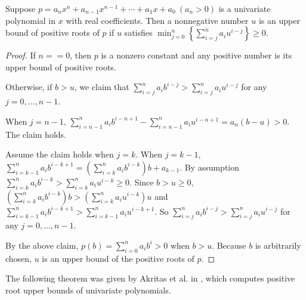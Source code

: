 \begin{theorem} \label{thm:log}
  Suppose   $p=a_nx^n+a_{n-1}x^{n-1}+\cdots+a_1x+a_0\ (a_n>0)$  is a univariate polynomial in $x$ with real coefficients.  Then  a nonnegative number $u$ is an upper bound of positive roots of $p$ if $u$   satisfies $\min_{j=0}^{n}\left\{  \sum_{i=j}^n a_i u^{i-j}\right\}\ge0$.
\end{theorem}
\begin{proof}
  If $n= =0$, then $p$ is a nonzero constant and any positive number is its upper bound of positive roots.

  Otherwise, if $b>u$,  we claim that $\sum_{i=j}^na_ib^{i-j}> \sum_{i=j}^na_iu^{i-j}$ for any $j= 0,\ldots,n-1$.

  When $j=n-1$, $\sum_{i=n-1}^na_ib^{i-n+1}-\sum_{i=n-1}^na_iu^{i-n+1}=a_n(b-u)>0.$ The claim holds.

  Assume the claim holds  when $j=k$. When $j=k-1$,  $\sum_{i=k-1}^na_ib^{i-k+1}=\left(\sum_{i=k}^na_ib^{i-k}\right)b+a_{k-1} $. By assumption
  $\sum_{i=k}^na_ib^{i-k}>\sum_{i=k}^na_iu^{i-k}\ge0$. Since $b>u\ge0$, $\left(\sum_{i=k}^na_ib^{i-k}\right)b>\left (\sum_{i=k}^na_iu^{i-k} \right)u  $
  and $\sum_{i=k-1}^na_ib^{i-k+1}> \sum_{i=k-1}^na_iu^{i-k+1}$. So  $\sum_{i=j}^na_ib^{i-j}> \sum_{i=j}^na_iu^{i-j}$ for any $j= 0,\ldots,n-1$.


  By the above claim,   $p(b)=\sum_{i=0}^na_ib^i>0$ when  $b>u$. Because $b$ is arbitrarily chosen, $u$ is an upper bound of the positive roots of $p$.

\end{proof}


The following theorem was given by Akritas et al. in  \cite{akr06,akr08}, which computes positive root upper bounds of univariate polynomials.

